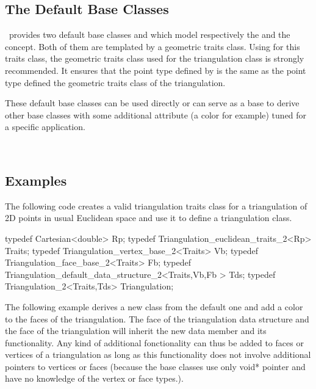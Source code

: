 \subsection{The Default Base Classes}
\cgal\ provides two default base classes 
 and 
which model respectively 
the  and the  concept.
Both of them are templated by a geometric traits class.
Using for this traits class, the geometric traits class used for the triangulation class
is strongly recommended. 
It ensures that the point type defined by 
is the same as the point type defined the  geometric traits class of
the triangulation.

These default base classes can be used directly or can serve as a base to derive
other base classes with some additional attribute (a color for example)
tuned for a specific application.

 \\

\subsection{Examples}
\ccExample
The following code creates a  valid triangulation traits class 
for a triangulation of 2D points in usual Euclidean space
and use it to define a triangulation class.

\begin{cprog}

typedef Cartesian<double> Rp;
typedef Triangulation_euclidean_traits_2<Rp> Traits;
typedef Triangulation_vertex_base_2<Traits> Vb;
typedef Triangulation_face_base_2<Traits> Fb;
typedef Triangulation_default_data_structure_2<Traits,Vb,Fb > Tds;
typedef Triangulation_2<Traits,Tds> Triangulation;

\end{cprog}

\ccExample
The following example derives a new  class from the default
one and add a color to the faces of the triangulation. 
The face of the triangulation data structure
and the face of the triangulation will inherit the new data member 
and its functionality.
Any kind of additional fonctionality can thus be added to faces or vertices of a triangulation 
as long as this functionality  does not involve additional pointers to vertices or faces
(because the base classes use only void* pointer and have no knowledge
of the vertex or face types.).


